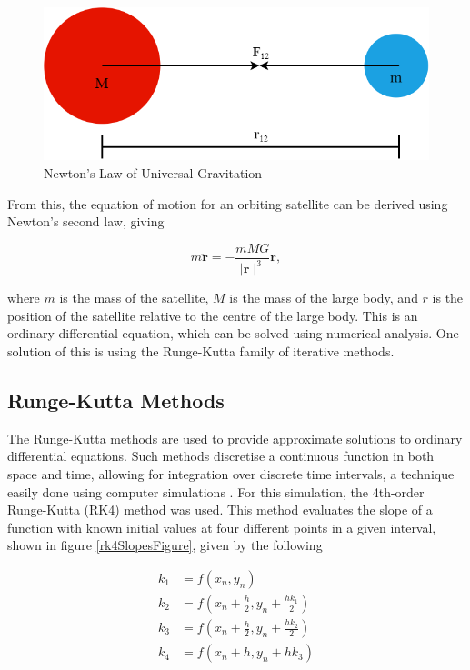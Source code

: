 \documentclass[twocolumn,prl,nobalancelastpage,aps,10pt]{revtex4-1}
\begin{document}
\begin{figure}[h!]
\includegraphics*[width=0.96\linewidth,clip]{newtonGravitation}
\caption{Newton's Law of Universal Gravitation} \label{gravitationFigure}
\end{figure}

From this, the equation of motion for an orbiting satellite can be derived using Newton's second law, giving \cite{Newton1848}

\begin{equation}\label{equationMotion}
m \bm{\ddot{r}} = - \frac{mMG}{\mid\bm{r}\mid^{3}}\bm{r} ,
\end{equation}

where $m$ is the mass of the satellite, $M$ is the mass of the large body, and $r$ is the position of the satellite relative to the centre of the large body. This is an ordinary differential equation, which can be solved using numerical analysis. One solution of this is using the Runge-Kutta family of iterative methods.

\subsection{Runge-Kutta Methods}

The Runge-Kutta methods are used to provide approximate solutions to ordinary differential equations. Such methods discretise a continuous function in both space and time, allowing for integration over discrete time intervals, a technique easily done using computer simulations \cite{DeVries2011}. For this simulation, the 4th-order Runge-Kutta (RK4) method was used. This method evaluates the slope of a function with known initial values at four different points in a given interval, shown in figure \ref{rk4SlopesFigure}, given by the following \cite{Press2007, Atkinson1989}


\begin{align}
k_{1}& = f(x_{n}, y_{n}) \\
k_{2}& = f(x_{n} + \frac{h}{2}, y_{n} + \frac{hk_{1}}{2})\\
k_{3}& = f(x_{n} + \frac{h}{2}, y_{n} + \frac{hk_{2}}{2})\\
k_{4}& = f(x_{n} + h, y_{n} + hk_{3})
\end{align}
\end{document}
